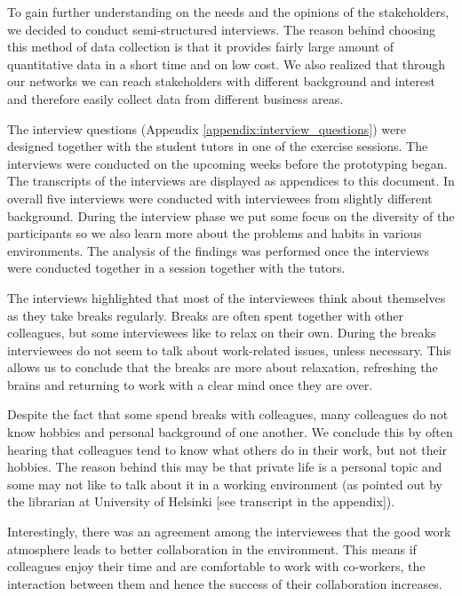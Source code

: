 To gain further understanding on the needs and the opinions of the stakeholders, we decided to conduct semi-structured interviews. The reason behind choosing this method of data collection is that it provides fairly large amount of quantitative data in a short time and on low cost. We also realized that through our networks we can reach stakeholders with different background and interest and therefore easily collect data from different business areas. 

The interview questions (Appendix \ref{appendix:interview_questions}) were designed together with the student tutors in one of the exercise sessions. The interviews were conducted on the upcoming weeks before the prototyping began. The transcripts of the interviews are displayed as appendices to this document. In overall five interviews were conducted with interviewees from slightly different background. During the interview phase we put some focus on the diversity of the participants so we also learn more about the problems and habits in various environments. The analysis of the findings was performed once the interviews were conducted together in a session together with the tutors.

The interviews highlighted that most of the interviewees think about themselves as they take breaks regularly. Breaks are often spent together with other colleagues, but some interviewees like to relax on their own. During the breaks interviewees do not seem to talk about work-related issues, unless necessary. This allows us to conclude that the breaks are more about relaxation, refreshing the brains and returning to work with a clear mind once they are over. 

Despite the fact that some spend breaks with colleagues, many colleagues do not know hobbies and personal background of one another. We conclude this by often hearing that colleagues tend to know what others do in their work, but not their hobbies. The reason behind this may be that private life is a personal topic and some may not like to talk about it in a working environment (as pointed out by the librarian at University of Helsinki [see transcript in the appendix]). 

Interestingly, there was an agreement among the interviewees that the good work atmosphere leads to better collaboration in the environment. This means if colleagues enjoy their time and are comfortable to work with co-workers, the interaction between them and hence the success of their collaboration increases. 